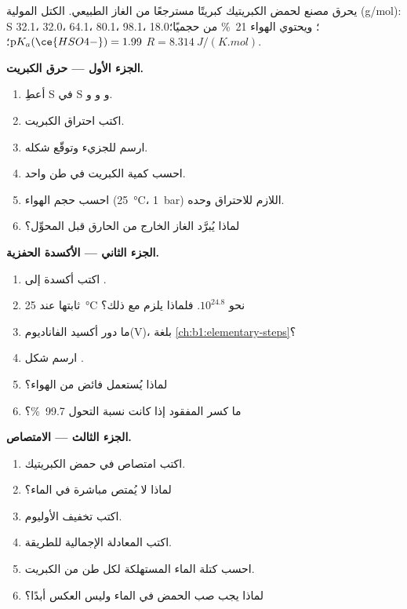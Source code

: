 \begin{problem}
\label{pb:b1:p-block-16-18:1}
يحرق مصنع لحمض الكبريتيك كبريتًا مسترجعًا من الغاز الطبيعي. الكتل المولية
(\unit{g/mol}): S 32.1،  32.0،  64.1،  80.1،
 98.1،  18.0؛ ويحتوي الهواء \qty{21}{\percent} من
 حجميًا؛ $\mathrm{p}K_a(\ce{HSO4-}) = 1.99$؛ $R =
\qty{8.314}{J/(K.mol)}$.

\medskip
\noindent\textbf{الجزء الأول --- حرق الكبريت.}
\begin{enumerate}
  \item أعطِ  S في S و و
        و.
  \item اكتب احتراق الكبريت.
  \item ارسم  للجزيء  وتوقّع شكله.
  \item احسب كمية الكبريت في طن واحد.
  \item احسب حجم الهواء (\qty{25}{\celsius}، \qty{1}{bar}) اللازم
        للاحتراق وحده.
  \item لماذا يُبرَّد الغاز الخارج من الحارق قبل المحوِّل؟
\end{enumerate}

\medskip
\noindent\textbf{الجزء الثاني --- الأكسدة الحفزية.}
\begin{enumerate}[resume]
  \item اكتب أكسدة  إلى .
  \item ثابتها عند \qty{25}{\celsius} نحو $10^{24.8}$. فلماذا يلزم
         مع ذلك؟
  \item ما دور أكسيد الفاناديوم(V)، بلغة
        \cref{ch:b1:elementary-steps}؟
  \item ارسم شكل .
  \item لماذا يُستعمل فائض من الهواء؟
  \item ما كسر  المفقود إذا كانت نسبة التحول
        \qty{99.7}{\percent}؟
\end{enumerate}

\medskip
\noindent\textbf{الجزء الثالث --- الامتصاص.}
\begin{enumerate}[resume]
  \item اكتب امتصاص  في حمض الكبريتيك.
  \item لماذا لا يُمتص  مباشرة في الماء؟
  \item اكتب تخفيف الأوليوم.
  \item اكتب المعادلة الإجمالية للطريقة.
  \item احسب كتلة الماء المستهلكة لكل طن من الكبريت.
  \item لماذا يجب صب الحمض في الماء وليس العكس أبدًا؟
\end{enumerate}


\end{problem}
